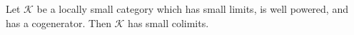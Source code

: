 Let $\mathcal{K}$ be a locally small category which has small limits, is well powered, and has a cogenerator. Then $\mathcal{K}$ has small colimits.
